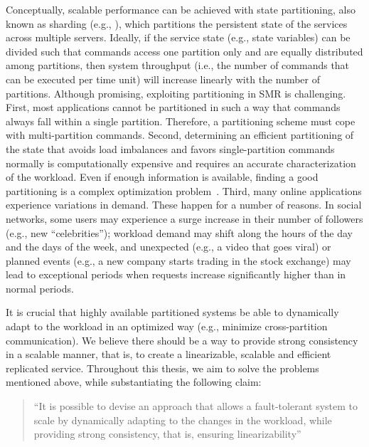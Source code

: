 Conceptually, scalable performance can be achieved with state partitioning, also
known as sharding (e.g., \cite{facebookTAO, sciascia2012sdur, aguilera2007sinfonia}),
which partitions the persistent state of the services across multiple servers.
Ideally, if the service state (e.g., state variables) can be divided
such that commands access one partition only and are equally distributed among
partitions, then system throughput (i.e., the number of commands that can be
executed per time unit) will increase linearly with the number of partitions.
Although promising, exploiting partitioning in SMR is challenging. First, most
applications cannot be partitioned in such a way that commands always fall
within a single partition. Therefore, a partitioning scheme must cope with
multi-partition commands. Second, determining an efficient partitioning of the
state that avoids load imbalances and favors single-partition commands normally
is computationally expensive and requires an accurate characterization of the
workload. Even if enough information is available, finding a good partitioning
is a complex optimization problem~\cite{curino2010sch,taft2014est}. Third, many
online applications experience variations in demand. These happen for a number
of reasons. In social networks, some users may experience a surge increase in
their number of followers (e.g., new ``celebrities''); workload demand may shift
along the hours of the day and the days of the week, and unexpected (e.g., a
video that goes viral) or planned events (e.g., a new company starts trading in
the stock exchange) may lead to exceptional periods when requests increase
significantly higher than in normal periods. %

It is crucial that highly available partitioned systems be able to dynamically
adapt to the workload in an optimized way (e.g., minimize cross-partition
communication). We believe there should be a way to provide strong consistency
in a scalable manner, that is, to create a linearizable, scalable and efficient
replicated service. Throughout this thesis, we aim to solve the problems
mentioned above, while substantiating the following claim:

\begin{quote}
``It is possible to devise an approach that allows a fault-tolerant system to
scale by dynamically adapting to the changes in the workload, while providing
strong consistency, that is, ensuring linearizability''
\end{quote}


